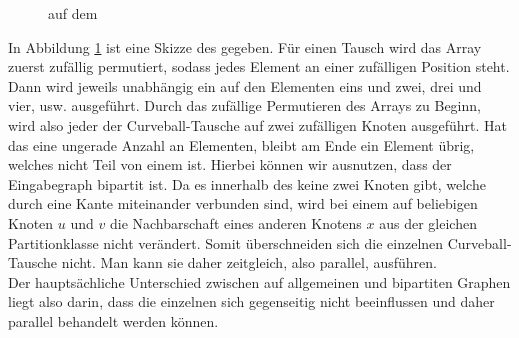 \begin{figure}[h]
\centering
  \caption{\gc{} auf dem \partvek}
  \label{fig:global_curveball_trade_vector}
  
\end{figure}
%
%
%
In Abbildung \ref{fig:global_curveball_trade_vector} ist eine Skizze des  gegeben.
Für einen \gc{} Tausch wird das Array zuerst zufällig permutiert, sodass jedes Element an einer zufälligen
Position steht.
Dann wird jeweils unabhängig ein \ct{} auf den Elementen eins und zwei, drei und vier, usw. ausgeführt.
Durch das zufällige Permutieren des Arrays zu Beginn, wird also jeder der Curveball-Tausche auf zwei zufälligen
Knoten ausgeführt. Hat das \partvek{} eine ungerade Anzahl an Elementen, bleibt am Ende ein Element übrig, 
welches nicht Teil von einem \ct{} ist. 
Hierbei können wir ausnutzen, dass der Eingabegraph bipartit ist. Da es innerhalb des 
keine zwei Knoten gibt, welche durch eine Kante miteinander verbunden sind, 
wird bei einem \ct{} auf beliebigen Knoten $u$ und $v$ 
die Nachbarschaft eines anderen Knotens $x$  aus der gleichen Partitionklasse nicht verändert. Somit
\glqq überschneiden\grqq{} sich die einzelnen Curveball-Tausche nicht. Man kann sie daher zeitgleich, 
also parallel, ausführen. 
\\
Der hauptsächliche Unterschied zwischen \gc{} auf allgemeinen und bipartiten Graphen liegt also darin, 
dass die einzelnen  sich gegenseitig nicht beeinflussen und daher parallel behandelt werden können.
